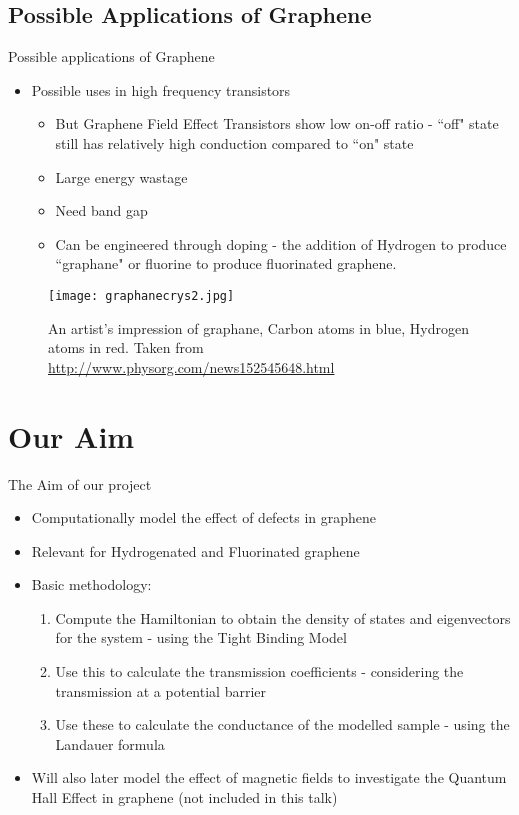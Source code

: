 \documentclass{beamer}
\begin{document}
\subsection{Possible Applications of Graphene}
\begin{frame}[t]{Possible applications of Graphene}
\begin{itemize}
\item Possible uses in high frequency transistors
\begin{itemize}
\item  But Graphene Field Effect Transistors show low on-off ratio - ``off" state still has relatively high conduction compared to ``on" state
\item Large energy wastage
\item Need band gap
\item Can be engineered through doping - the addition of Hydrogen to produce ``graphane" or fluorine to produce fluorinated graphene.
\end{itemize}
\end{itemize}

\begin{figure}[c]
\texttt{[image: graphanecrys2.jpg]}
\caption{An artist's impression of graphane, Carbon atoms in blue, Hydrogen atoms in red. Taken from \url{http://www.physorg.com/news152545648.html}}
\end{figure}
\end{frame}


\section{Our Aim}
\begin{frame}[t]{The Aim of our project}
\begin{itemize}
\item Computationally model the effect of defects in graphene
\item Relevant for Hydrogenated and Fluorinated graphene
\item Basic methodology:
\begin{enumerate}
\item Compute the Hamiltonian to obtain the density of states and eigenvectors for the system - using the Tight Binding Model
\item Use this to calculate the transmission coefficients - considering the transmission at a potential barrier
\item Use these to calculate the conductance of the modelled sample - using the Landauer formula
\end{enumerate}
\item Will also later model the effect of magnetic fields to investigate the  Quantum Hall Effect in graphene (not included in this talk)
\end{itemize}
\end{frame}
\end{document}
